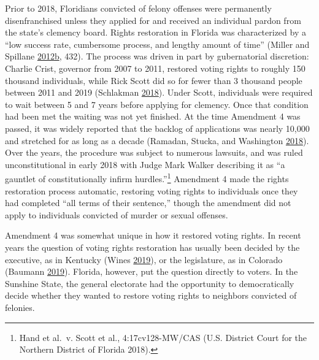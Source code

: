 \documentclass[
  12pt,
]{article}
\begin{document}
Prior to 2018, Floridians convicted of felony offenses were permanently disenfranchised unless they applied for and received an individual pardon from the state's clemency board. Rights restoration in Florida was characterized by a ``low success rate, cumbersome process, and lengthy amount of time'' (Miller and Spillane \protect\hyperlink{ref-Miller2012a}{2012}\protect\hyperlink{ref-Miller2012a}{b}, 432). The process was driven in part by gubernatorial discretion: Charlie Crist, governor from 2007 to 2011, restored voting rights to roughly 150 thousand individuals, while Rick Scott did so for fewer than 3 thousand people between 2011 and 2019 (Schlakman \protect\hyperlink{ref-Schlakman2018}{2018}). Under Scott, individuals were required to wait between 5 and 7 years before applying for clemency. Once that condition had been met the waiting was not yet finished. At the time Amendment 4 was passed, it was widely reported that the backlog of applications was nearly 10,000 and stretched for as long as a decade (Ramadan, Stucka, and Washington \protect\hyperlink{ref-Ramadan2018}{2018}). Over the years, the procedure was subject to numerous lawsuits, and was ruled unconstitutional in early 2018 with Judge Mark Walker describing it as ``a gauntlet of constitutionally infirm hurdles.''\footnote{Hand et al.~v. Scott et al., 4:17cv128-MW/CAS (U.S. District Court for the Northern District of Florida 2018).} Amendment 4 made the rights restoration process automatic, restoring voting rights to individuals once they had completed ``all terms of their sentence,'' though the amendment did not apply to individuals convicted of murder or sexual offenses.

Amendment 4 was somewhat unique in how it restored voting rights. In recent years the question of voting rights restoration has usually been decided by the executive, as in Kentucky (Wines \protect\hyperlink{ref-Wines2019}{2019}), or the legislature, as in Colorado (Baumann \protect\hyperlink{ref-Baumann2019}{2019}). Florida, however, put the question directly to voters. In the Sunshine State, the general electorate had the opportunity to democratically decide whether they wanted to restore voting rights to neighbors convicted of felonies.
\end{document}
